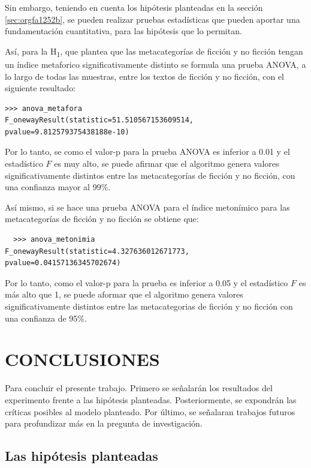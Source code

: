 \documentclass[12pt,letterpaper,twoside]{article}
\begin{document}
Sin embargo, teniendo en cuenta los hipótesis planteadas en la sección \ref{sec:orgfa1252b},
se pueden realizar pruebas estadísticas que pueden aportar una fundamentación cuantitativa,
para las hipótesis que lo permitan.

Así, para la H\textsubscript{1}, que plantea que las metacategorías de ficción y no ficción tengan un
índice metaforico significativamente distinto se formula una prueba ANOVA, a lo largo de
todas las muestras, entre los textos de ficción y no ficción, con el siguiente resultado:

\begin{verbatim}
>>> anova_metafora
F_onewayResult(statistic=51.510567153609514, pvalue=9.812579375438188e-10)

\end{verbatim}

Por lo tanto, se como el valor-p para la prueba ANOVA es inferior a 0.01 y
el estadístico \(F\) es muy alto, se puede afirmar que el algoritmo genera valores
significativamente distintos entre las metacategorías de ficción y no ficción,
con una confianza mayor al 99\%.

Así mismo, si se hace una prueba ANOVA para el índice metonímico para las
metacategorías de ficción y no ficción se obtiene que:


\begin{verbatim}
  >>> anova_metonimia
F_onewayResult(statistic=4.327636012671773, pvalue=0.04157136345702674)

\end{verbatim}

Por lo tanto, como el valor-p para la prueba es inferior a 0.05 y el estadístico
\(F\) es más alto que 1, se puede aformar que el algoritmo genera valores
significativamente distintos entre las metacategorias de ficción y no ficción
con una confianza de 95\%.



\section{CONCLUSIONES}
\label{sec:org7eacbd3}

Para concluir el presente trabajo. Primero se señalarán los
resultados del experimento frente a las hipótesis planteadas.
Posteriormente, se expondrán las críticas posibles al modelo
planteado. Por último, se señalaran trabajos futuros para profundizar
más en la pregunta de investigación.

\subsection{Las hipótesis planteadas}
\label{sec:org6a93668}
\end{document}
